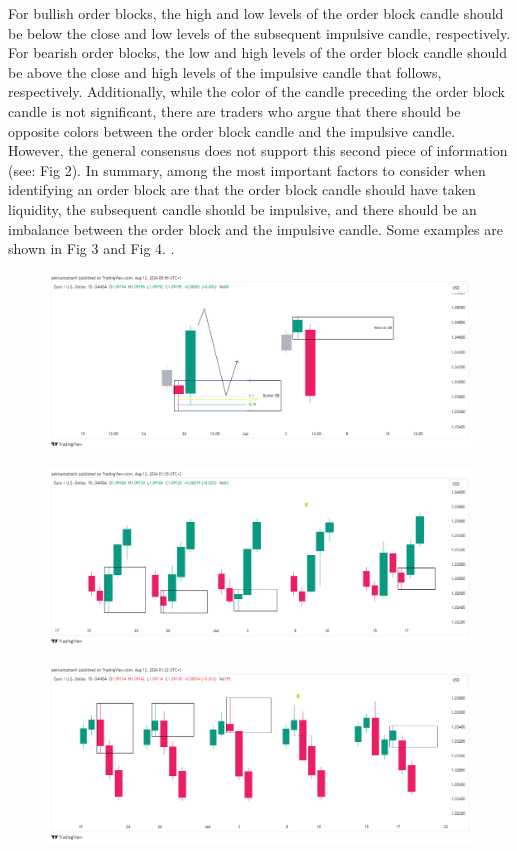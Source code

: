 For bullish order blocks, the high and low levels of the order block candle should be below the close and low levels of the subsequent impulsive candle, respectively. For bearish order blocks, the low and high levels of the order block candle should be above the close and high levels of the impulsive candle that follows, respectively. Additionally, while the color of the candle preceding the order block candle is not significant, there are traders who argue that there should be opposite colors between the order block candle and the impulsive candle. However, the general consensus does not support this second piece of information (see: Fig 2). In summary, among the most important factors to consider when identifying an order block are that the order block candle should have taken liquidity, the subsequent candle should be impulsive, and there should be an imbalance between the order block and the impulsive candle. Some examples are shown in Fig 3 and Fig 4. \cite{OB1} \cite{OB2}.

\begin{figure}[H]
    \centering
    \includegraphics[scale=0.35]{Images/OB-2.png}
    \caption{}
    \label{Fig.2}
\end{figure}

\begin{figure}[H]
    \centering
    \includegraphics[scale=0.35]{Images/OB-3.png}
    \caption{}
    \label{Fig.3}
\end{figure}
\begin{figure}[H]
    \centering
    \includegraphics[scale=0.35]{Images/OB-4.png}
    \caption{}
    \label{Fig.4}
\end{figure}
